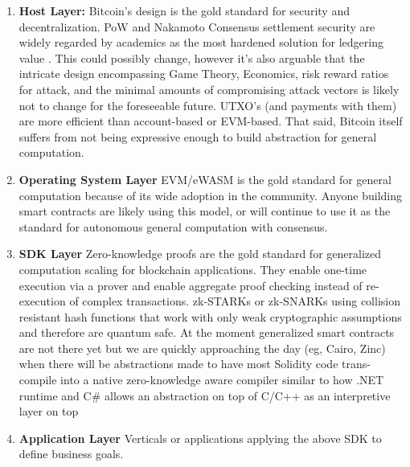 \documentclass[peerreview]{ieeesyscoin}
\begin{document}
\begin{enumerate}
\item \textbf{Host Layer: }Bitcoin’s design is the gold standard for security and decentralization. PoW and Nakamoto Consensus settlement security are widely regarded by academics as the most hardened solution for ledgering value \cite{Bit15}. This could possibly change, however it's also arguable that the intricate design encompassing Game Theory, Economics, risk reward ratios for attack, and the minimal amounts of compromising attack vectors is likely not to change for the foreseeable future. UTXO’s (and payments with them) are more efficient than account-based or EVM-based. That said, Bitcoin itself suffers from not being expressive enough to build abstraction for general computation. 
\item \textbf{Operating System Layer} EVM/eWASM is the gold standard for general computation because of its wide adoption in the community. Anyone building smart contracts are likely using this model, or will continue to use it as the standard for autonomous general computation with consensus.
\item \textbf{SDK Layer} Zero-knowledge proofs are the gold standard for generalized computation scaling for blockchain applications. They enable one-time execution via a prover and enable aggregate proof checking instead of re-execution of complex transactions. zk-STARKs or zk-SNARKs using collision resistant hash functions that work with only weak cryptographic assumptions and therefore are quantum safe. At the moment generalized smart contracts are not there yet but we are quickly approaching the day (eg, Cairo, Zinc) when there will be abstractions made to have most Solidity code trans-compile into a native zero-knowledge aware compiler similar to how .NET runtime and C\# allows an abstraction on top of C/C++ as an interpretive layer on top
\item \textbf{Application Layer} Verticals or applications applying the above SDK to define business goals. 
\end{enumerate}
\end{document}
